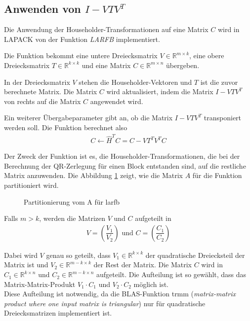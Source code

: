 \subsection{Anwenden von $I - VTV^T$} \label{applyT}
Die Anwendung der Householder-Transformationen auf eine Matrix $C$ wird in LAPACK von der  Funktion \textit{LARFB} implementiert.

Die Funktion bekommt eine untere Dreiecksmatrix $V \in \mathbb{R}^{m \times k}$, eine obere Dreiecksmatrix $T \in \mathbb{R}^{k \times k}$ und eine Matrix $C \in \mathbb{R}^{m \times n }$ übergeben.

In der Dreiecksmatrix $V$ stehen die Householder-Vektoren und $T$ ist die zuvor berechnete Matrix.
Die Matrix $C$ wird aktualisiert, indem die Matrix $I - V T V^T $ von rechts auf die Matrix $ C $ angewendet wird. 

Ein weiterer Übergabeparameter gibt an, ob die Matrix  $I - V T V^T $ transponiert werden soll.
Die Funktion berechnet also
\begin{align}
	C \leftarrow \hat{H}^T C = C - V T^T V^T C	\label{eq:larfb}
\end{align}

Der Zweck der Funktion ist es, die Householder-Transformationen, die bei der Berechnung der QR-Zerlegung für einen Block entstanden sind, auf die restliche Matrix anzuwenden.
Die Abbildung \ref{fig:patrA} zeigt, wie die Matrix $A$ für die Funktion partitioniert wird.
\begin{figure} [H]
	\centering
	
	\caption{Partitionierung vom A für larfb}
	\label{fig:patrA}
\end{figure}
Falls $m > k $, werden die Matrizen $V$ und $C$ aufgeteilt in
\begin{align}
	V=\left(\dfrac{V_1}{V_2}\right)  \text{  und  } C=\left(\dfrac{C_1}{C_2}\right)
	\label{eq:aufteilen}
\end{align}

Dabei wird $V$ genau so geteilt, dass $V_1 \in \mathbb{R}^{k\times k}$ der quadratische Dreiecksteil der Matrix ist und $V_2 \in \mathbb{R}^{m-k\times k}$ der Rest der Matrix. Die Matrix $C$ wird in $C_1 \in \mathbb{R}^{k \times n}$ und $C_2 \in \mathbb{R}^{m-k \times n}$  aufgeteilt. Die Aufteilung ist so gewählt, dass das Matrix-Matrix-Produkt $V_1 \cdot C_1$ und $V_2 \cdot C_2$ möglich ist.\\
Diese Aufteilung ist notwendig, da die BLAS-Funktion trmm (\textit{matrix-matrix product where one input matrix is triangular}) nur für quadratische Dreiecksmatrizen implementiert ist.

